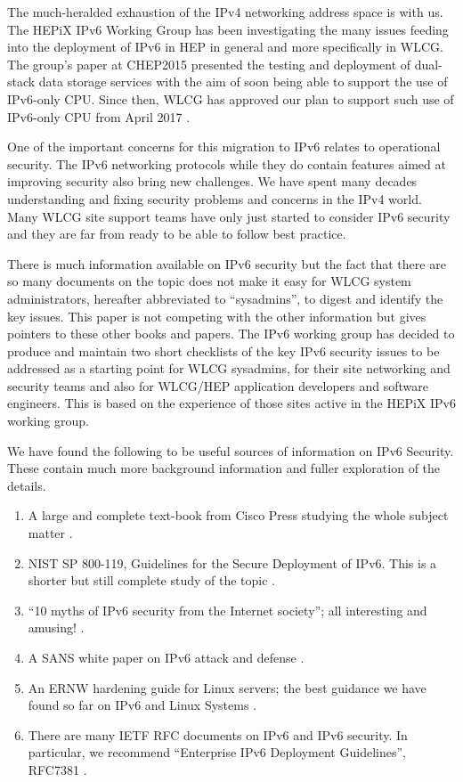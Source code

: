 
The much-heralded exhaustion of the IPv4 networking address space is with us. The HEPiX
IPv6 Working Group \cite{ipv6wg} has been investigating the many issues feeding into the deployment of IPv6 in HEP in general and more specifically in WLCG. The group's paper at CHEP2015 \cite{ipv6chep2015} presented the testing and deployment of dual-stack data storage services with the aim of soon being able to support the use of IPv6-only CPU. Since then, WLCG has approved our plan to support such use of IPv6-only CPU from April 2017 \cite{ipv6chep2016}.

One of the important concerns for this migration to IPv6 relates to operational security. The IPv6 networking protocols while they do contain features aimed at improving security also bring new challenges. We have spent many decades understanding and fixing security problems and concerns in the IPv4 world. Many WLCG site support teams have only just started to consider IPv6 security and they are far from ready to be able to follow best practice. 

There is much information available on IPv6 security but the fact that there are so many documents on the topic does not make it easy for WLCG system administrators, hereafter abbreviated to ``sysadmins'', to digest and identify the key issues. This paper is not competing with the other information but gives pointers to these other books and papers. The IPv6 working group has decided to produce and maintain two short checklists of the key IPv6 security issues to be addressed as a starting point for WLCG sysadmins, for their site networking and security teams and also for WLCG/HEP application developers and software engineers. This is based on the experience of those sites active in the HEPiX IPv6 working group.

We have found the following to be useful sources of information on IPv6 Security. These contain much more background information and fuller exploration of the details.

\begin {enumerate}
\item A large and complete text-book from Cisco Press studying the whole subject matter \cite{CiscoBook}.
\item NIST SP 800-119, Guidelines for the Secure Deployment of IPv6. This is a shorter but still complete study of the topic \cite{nist800-119}.
\item ``10 myths of IPv6 security from the Internet society''; all interesting and amusing! \cite{10myths}.
\item A SANS white paper on IPv6 attack and defense \cite {SANSipv6}.
\item An ERNW hardening guide for Linux servers; the best guidance we have found so far on IPv6 and Linux Systems \cite {ERNWipv6}.
\item There are many IETF RFC documents on IPv6 and IPv6 security. In particular, we recommend ``Enterprise IPv6 Deployment Guidelines'', RFC7381 \cite{rfc}.
\end {enumerate}

